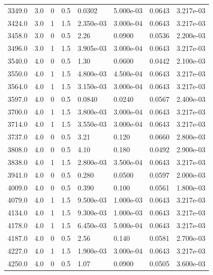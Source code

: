 \documentclass[preview]{standalone}
\begin{document}
{{{\begin{tabular}{L{1.2cm}C{1.2cm} C{0.3cm}C{0.5cm} C{1.4cm}C{1.4cm} C{1.4cm}C{1.4cm}}
  3349.0  &   3.0  & 0     & 0.5 &  0.0302  & 5.000e-03  & 0.0643 &  3.217e-03   \\ 
  3424.0  &   3.0  & 1     & 1.5 &  2.350e-03  & 3.000e-04  & 0.0643 &  3.217e-03   \\ 
  3458.0  &   3.0  & 0     & 0.5 &  2.26  & 0.0900  & 0.0536 &  2.200e-03   \\ 
  3496.0  &   3.0  & 1     & 1.5 &  3.905e-03  & 3.000e-04  & 0.0643 &  3.217e-03   \\ 
  3540.0  &   4.0  & 0     & 0.5 &  1.30  & 0.0600  & 0.0442 &  2.100e-03   \\ 
  3550.0  &   4.0  & 1     & 1.5 &  4.800e-03  & 4.500e-04  & 0.0643 &  3.217e-03   \\ 
  3564.0  &   4.0  & 1     & 1.5 &  3.150e-03  & 3.000e-04  & 0.0643 &  3.217e-03   \\ 
  3597.0  &   4.0  & 0     & 0.5 &  0.0840  & 0.0240  & 0.0567 &  2.400e-03   \\ 
  3700.0  &   4.0  & 1     & 1.5 &  3.800e-03  & 3.000e-04  & 0.0643 &  3.217e-03   \\ 
  3714.0  &   4.0  & 1     & 1.5 &  3.550e-03  & 3.000e-04  & 0.0643 &  3.217e-03   \\ 
  3737.0  &   4.0  & 0     & 0.5 &  3.21  & 0.120  & 0.0660 &  2.800e-03   \\ 
  3808.0  &   4.0  & 0     & 0.5 &  4.10  & 0.180  & 0.0492 &  2.900e-03   \\ 
  3838.0  &   4.0  & 1     & 1.5 &  2.800e-03  & 3.500e-04  & 0.0643 &  3.217e-03   \\ 
  3941.0  &   4.0  & 0     & 0.5 &  0.280  & 0.0500  & 0.0597 &  2.000e-03   \\ 
  4009.0  &   4.0  & 0     & 0.5 &  0.390  & 0.100  & 0.0561 &  1.800e-03   \\ 
  4079.0  &   4.0  & 1     & 1.5 &  9.500e-03  & 1.000e-03  & 0.0643 &  3.217e-03   \\ 
  4134.0  &   4.0  & 1     & 1.5 &  9.300e-03  & 1.000e-03  & 0.0643 &  3.217e-03   \\ 
  4178.0  &   4.0  & 1     & 1.5 &  6.450e-03  & 5.000e-04  & 0.0643 &  3.217e-03   \\ 
  4187.0  &   4.0  & 0     & 0.5 &  2.56  & 0.140  & 0.0581 &  2.700e-03   \\ 
  4227.0  &   4.0  & 1     & 1.5 &  1.900e-03  & 3.000e-04  & 0.0643 &  3.217e-03   \\ 
  4250.0  &   4.0  & 0     & 0.5 &  1.07  & 0.0900  & 0.0505 &  3.600e-03   \\ 

\end{tabular}}}}
\end{document}
